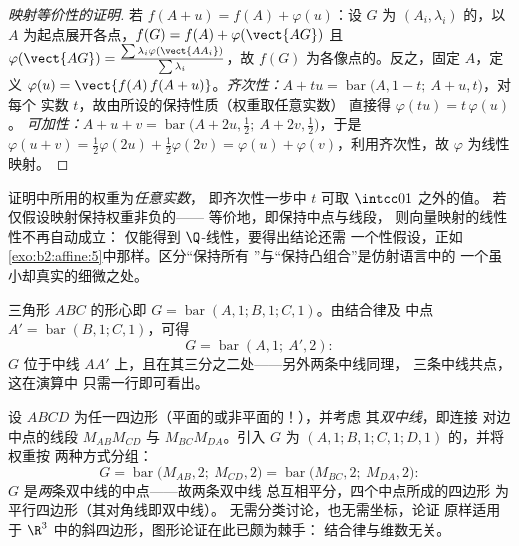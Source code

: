 \begin{proof}[映射等价性的证明]
若 $f(A + u) = f(A) + \varphi(u)$：设 $G$ 为 $(A_i,
\lambda_i)$ 的，以 $A$ 为起点展开各点，$f(G) = f(A) +
\varphi(\vect{AG})$ 且 $\varphi(\vect{AG}) =
\frac{\sum\lambda_i\varphi(\vect{AA_i})}{\sum\lambda_i}$，故 $f(G)$
为各像点的。反之，固定 $A$，定义
$\varphi(u) = \vect{f(A)\,f(A + u)}$。\emph{齐次性：}$A + tu =
\operatorname{bar}\bigl(A, 1-t;\ A + u, t\bigr)$，对每个
实数 $t$，故由所设的保持性质（权重取任意实数）
直接得 $\varphi(tu) = t\,\varphi(u)$。
\emph{可加性：}$A + u + v = \operatorname{bar}\bigl(A + 2u,
\tfrac12;\ A + 2v, \tfrac12\bigr)$，于是 $\varphi(u + v) =
\tfrac12\varphi(2u) + \tfrac12\varphi(2v) = \varphi(u) +
\varphi(v)$，利用齐次性，故 $\varphi$ 为线性映射。
\end{proof}

\begin{remark}
证明中所用的权重为\emph{任意实数}，
即齐次性一步中 $t$ 可取 $\intcc01$ 之外的值。
若仅假设映射保持权重非负的——
等价地，即保持中点与线段，
则向量映射的线性性不再自动成立：
仅能得到 $\Q$-线性，要得出结论还需
一个性假设，正如
\cref{exo:b2:affine:5}中那样。区分“保持所有
”与“保持凸组合”是仿射语言中的
一个虽小却真实的细微之处。
\end{remark}

\begin{example}[经典的重心几何]\label{ex:b2:affine:median}
三角形 $ABC$ 的形心即 $G =
\operatorname{bar}(A,1; B,1; C,1)$。由结合律及
中点 $A' = \operatorname{bar}(B, 1; C, 1)$，可得
\[
G = \operatorname{bar}(A, 1;\ A', 2) :
\]
$G$ 位于中线 $AA'$ 上，且在其三分之二处——另外两条中线同理，
三条中线共点，这在演算中
只需一行即可看出。
\end{example}

\begin{example}\label{ex:b2:affine:bimedians}
设 $ABCD$ 为任一四边形（平面的或非平面的！），并考虑
其\emph{双中线}，即连接
对边中点的线段 $M_{AB}M_{CD}$ 与 $M_{BC}M_{DA}$。引入
$G$ 为 $(A,1; B,1; C,1; D,1)$ 的，并将权重按
两种方式分组：
\[
G = \operatorname{bar}\bigl(M_{AB}, 2;\ M_{CD}, 2\bigr)
= \operatorname{bar}\bigl(M_{BC}, 2;\ M_{DA}, 2\bigr) :
\]
$G$ 是\emph{两}条双中线的中点——故两条双中线
总互相平分，四个中点所成的四边形
为平行四边形（其对角线即双中线）。
无需分类讨论，也无需坐标，论证
原样适用于
$\R^3$ 中的斜四边形，图形论证在此已颇为棘手：
结合律与维数无关。
\end{example}

